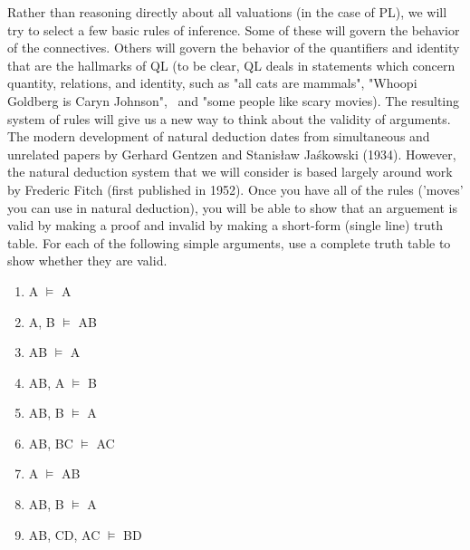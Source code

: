 Rather than reasoning directly about all valuations (in the case of PL), we will try to select a few basic rules of inference. Some of these will govern the behavior of the connectives. Others will govern the behavior of the quantifiers and identity that are the hallmarks of QL (to be clear, QL deals in statements which concern quantity, relations, and identity, such as "all cats are mammals", "Whoopi Goldberg is Caryn Johnson",  and "some people like scary movies). The resulting system of rules will give us a new way to think about the validity of arguments. The modern development of natural deduction dates from simultaneous and unrelated papers by Gerhard Gentzen and Stanisław Jaśkowski (1934). However, the natural deduction system that we will consider is based largely around work by Frederic Fitch (first published in 1952). Once you have all of the rules ('moves' you can use in natural deduction), you will be able to show that an arguement is valid by making a proof and invalid by making a short-form (single line) truth table. 
\practiceproblems
\problempart
\label{pr.basicinferencerulestables}
For each of the following simple arguments, use a complete truth table to show whether they are valid. 
\begin{enumerate}
\item A $\vDash$ A
\item A, B $\vDash$ A\eand B
\item A\eand B $\vDash$ A
\item A\eif B, A $\vDash$ B
\item A\eif B, \enot B $\vDash$ \enot A
\item A\eif B, B\eif C $\vDash$ A\eif C
\item A $\vDash$ A\eor B
\item A\eor B, \enot B $\vDash$ A
\item A\eif B, C\eif D, A\eor C $\vDash$ B\eor D
\end{enumerate}
\setcounter{seccount}{1}
